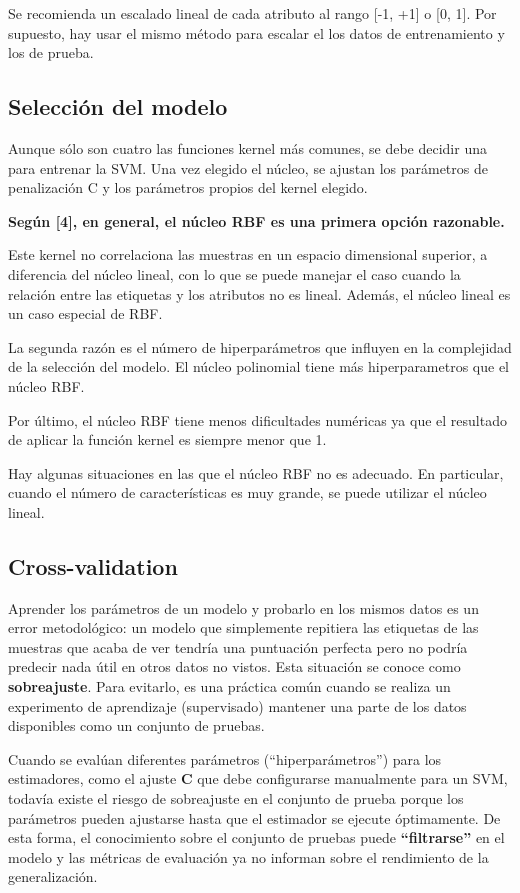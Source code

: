 \documentclass[11pt]{article}
\begin{document}
Se recomienda un escalado lineal de cada atributo al rango {[}-1, +1{]}
o {[}0, 1{]}. Por supuesto, hay usar el mismo método para escalar el los
datos de entrenamiento y los de prueba.

\subsection{Selección del modelo}\label{selecciuxf3n-del-modelo}

Aunque sólo son cuatro las funciones kernel más comunes, se debe decidir
una para entrenar la SVM. Una vez elegido el núcleo, se ajustan los
parámetros de penalización C y los parámetros propios del kernel
elegido.

\textbf{Según {[}4{]}, en general, el núcleo RBF es una primera opción
razonable.}

Este kernel no correlaciona las muestras en un espacio dimensional
superior, a diferencia del núcleo lineal, con lo que se puede manejar el
caso cuando la relación entre las etiquetas y los atributos no es
lineal. Además, el núcleo lineal es un caso especial de RBF.

La segunda razón es el número de hiperparámetros que influyen en la
complejidad de la selección del modelo. El núcleo polinomial tiene más
hiperparametros que el núcleo RBF.

Por último, el núcleo RBF tiene menos dificultades numéricas ya que el
resultado de aplicar la función kernel es siempre menor que 1.

Hay algunas situaciones en las que el núcleo RBF no es adecuado. En
particular, cuando el número de características es muy grande, se puede
utilizar el núcleo lineal.

\subsection{Cross-validation}\label{cross-validation}

Aprender los parámetros de un modelo y probarlo en los mismos datos es
un error metodológico: un modelo que simplemente repitiera las etiquetas
de las muestras que acaba de ver tendría una puntuación perfecta pero no
podría predecir nada útil en otros datos no vistos. Esta situación se
conoce como \textbf{sobreajuste}. Para evitarlo, es una práctica común
cuando se realiza un experimento de aprendizaje (supervisado) mantener
una parte de los datos disponibles como un conjunto de pruebas.

Cuando se evalúan diferentes parámetros (``hiperparámetros'') para los
estimadores, como el ajuste \textbf{C} que debe configurarse manualmente
para un SVM, todavía existe el riesgo de sobreajuste en el conjunto de
prueba porque los parámetros pueden ajustarse hasta que el estimador se
ejecute óptimamente. De esta forma, el conocimiento sobre el conjunto de
pruebas puede \textbf{``filtrarse''} en el modelo y las métricas de
evaluación ya no informan sobre el rendimiento de la generalización.
\end{document}
